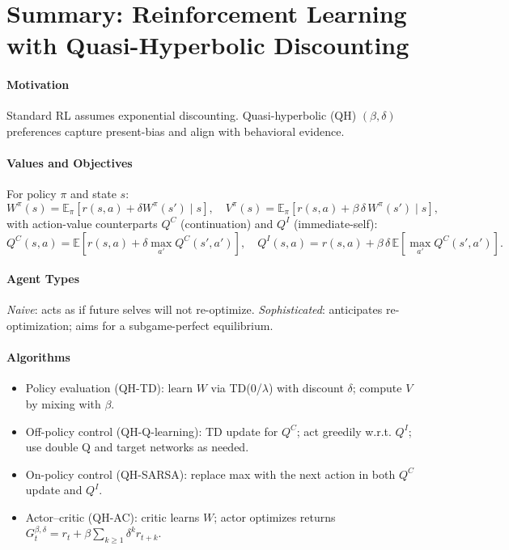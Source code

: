 
\section*{Summary: Reinforcement Learning with Quasi-Hyperbolic Discounting}

\paragraph{Motivation}
Standard RL assumes exponential discounting. Quasi-hyperbolic (QH) $(\beta,\delta)$ preferences capture present-bias and align with behavioral evidence.

\paragraph{Values and Objectives}
For policy $\pi$ and state $s$:
\[
  W^\pi(s) = \mathbb{E}_\pi[ r(s,a) + \delta W^\pi(s')\mid s],\quad
  V^\pi(s) = \mathbb{E}_\pi[ r(s,a) + \beta\,\delta\, W^\pi(s')\mid s],
\]
with action-value counterparts $Q^C$ (continuation) and $Q^I$ (immediate-self):
\[
  Q^C(s,a) = \mathbb{E}[ r(s,a) + \delta \max_{a'} Q^C(s',a')],\quad
  Q^I(s,a) = r(s,a) + \beta\,\delta\, \mathbb{E}[ \max_{a'} Q^C(s',a')].
\]

\paragraph{Agent Types}
\emph{Naive}: acts as if future selves will not re-optimize. \emph{Sophisticated}: anticipates re-optimization; aims for a subgame-perfect equilibrium.

\paragraph{Algorithms}
\begin{itemize}
  \item Policy evaluation (QH-TD): learn $W$ via TD(0/\(\lambda\)) with discount $\delta$; compute $V$ by mixing with $\beta$.
  \item Off-policy control (QH-Q-learning): TD update for $Q^C$; act greedily w.r.t. $Q^I$; use double Q and target networks as needed.
  \item On-policy control (QH-SARSA): replace max with the next action in both $Q^C$ update and $Q^I$.
  \item Actor--critic (QH-AC): critic learns $W$; actor optimizes returns $G_t^{\beta,\delta}= r_t + \beta \sum_{k\ge1} \delta^k r_{t+k}$.
\end{itemize}

